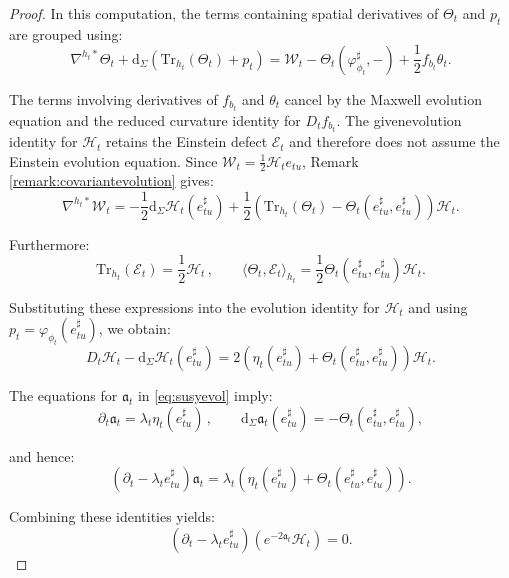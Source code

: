 \documentclass[10pt,reqno,a4paper]{amsart}
\theoremstyle{plain}
\theoremstyle{definition}
\theoremstyle{remark}
\theoremstyle{remark}
\def\dd{\mathrm{d}}
\newcommand{\Tr}{\mathrm{Tr}}
\def\cH{\mathcal{H}}
\def\cE{\mathcal{E}}
\def\cW{\mathcal{W}}
\def\cH{\mathcal{H}}
\def\fra{\mathfrak{a}}
\renewcommand{\(}{ (}
\renewcommand{\)}{ )}
\begin{document}
\begin{proof}
\noindent
In this computation, the terms containing spatial derivatives of
$\Theta_t$ and $p_t$ are grouped using:
\begin{equation*}
\nabla^{h_t\ast}\Theta_t
+\dd_{\Sigma} (\Tr_{h_t}(\Theta_t)+p_t )
=\cW_t-\Theta_t(\varphi_{\phi_t}^{\sharp},-)
+\frac{1}{2}f_{b_t}\theta_t.
\end{equation*}

\noindent
The terms involving derivatives of $f_{b_t}$ and $\theta_t$ cancel by the Maxwell evolution equation and the reduced curvature identity for $D_tf_{b_t}$. The givenevolution identity for $\cH_t$ retains the Einstein defect $\cE_t$ and therefore does not assume the Einstein evolution equation. Since $\cW_t=\frac{1}{2}\cH_t e_{tu}$, Remark \ref{remark:covariantevolution} gives:
\begin{equation*}
\nabla^{h_t\ast}\cW_t
=-\frac{1}{2}\dd_{\Sigma}\cH_t(e^{\sharp}_{tu})
+\frac{1}{2}
 (\Tr_{h_t}(\Theta_t)
-\Theta_t(e^{\sharp}_{tu},e^{\sharp}_{tu}) )\cH_t.
\end{equation*}

\noindent
Furthermore:
\begin{equation*}
\Tr_{h_t}(\cE_t)=\frac{1}{2}\cH_t\, , \qquad
\langle\Theta_t,\cE_t\rangle_{h_t}
=\frac{1}{2}\Theta_t(e^{\sharp}_{tu},e^{\sharp}_{tu})\cH_t.
\end{equation*}

\noindent
Substituting these expressions into the evolution identity for $\cH_t$ and using
$p_t=\varphi_{\phi_t}(e^{\sharp}_{tu})$, we obtain:
\begin{equation*}
D_t\cH_t-\dd_{\Sigma}\cH_t(e^{\sharp}_{tu})
=2 (
\eta_t(e^{\sharp}_{tu})
+\Theta_t(e^{\sharp}_{tu},e^{\sharp}_{tu})
 )\cH_t.
\end{equation*}

\noindent
The equations for $\fra_t$ in \eqref{eq:susyevol} imply:
\begin{equation*}
\partial_t\fra_t
=\lambda_t\eta_t(e^{\sharp}_{tu})\, , \qquad
\dd_{\Sigma}\fra_t(e^{\sharp}_{tu})
=-\Theta_t(e^{\sharp}_{tu},e^{\sharp}_{tu}),
\end{equation*}

\noindent
and hence:
\begin{equation*}
 (\partial_t-\lambda_t e^{\sharp}_{tu} )\fra_t
=\lambda_t (
\eta_t(e^{\sharp}_{tu})
+\Theta_t(e^{\sharp}_{tu},e^{\sharp}_{tu})
 ).
\end{equation*}

\noindent
Combining these identities yields:
\begin{equation*}
 (\partial_t-\lambda_t e^{\sharp}_{tu} )
 (e^{-2\fra_t}\cH_t )=0.
\end{equation*}


\end{proof}
\end{document}
